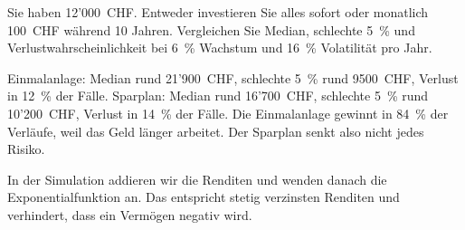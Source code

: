\begin{mychallenge}
	Sie haben 12'000~CHF. Entweder investieren Sie alles sofort oder monatlich 100~CHF während 10 Jahren. Vergleichen Sie Median, schlechte 5~\% und Verlustwahrscheinlichkeit bei 6~\% Wachstum und 16~\% Volatilität pro Jahr.
	\begin{myanswer}
		Einmalanlage: Median rund 21'900~CHF, schlechte 5~\% rund 9500~CHF, Verlust in 12~\% der Fälle. Sparplan: Median rund 16'700~CHF, schlechte 5~\% rund 10'200~CHF, Verlust in 14~\% der Fälle. Die Einmalanlage gewinnt in 84~\% der Verläufe, weil das Geld länger arbeitet. Der Sparplan senkt also nicht jedes Risiko.
	\end{myanswer}
\end{mychallenge}

\begin{myexcursion}
	In der Simulation addieren wir die Renditen und wenden danach die Exponentialfunktion an. Das entspricht stetig verzinsten Renditen und verhindert, dass ein Vermögen negativ wird.
\end{myexcursion}
